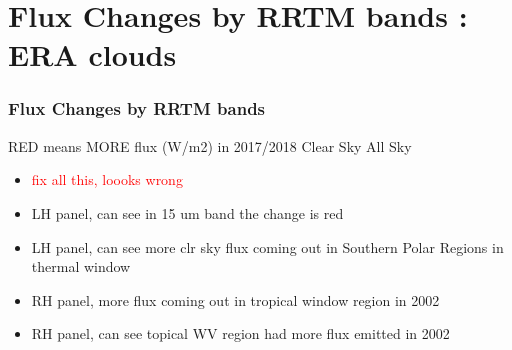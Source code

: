\documentclass[10pt,t]{beamer}
\begin{document}
\section{Flux Changes by RRTM bands : ERA clouds}
\begin{frame}
  \frametitle{Flux Changes by RRTM bands}
  RED means MORE flux (W/m2) in 2017/2018 \newline
  \hspace{0.50in} Clear Sky  \hspace{1.75in} All Sky \\
  \begin{center}
  \end{center}

  \begin{small}
    \begin{itemize}
    \item \textcolor{red}{fix all this, loooks wrong}
    \item LH panel, can see in 15 um band the change is red
    \item LH panel, can see more clr sky flux coming out in Southern Polar Regions in thermal window
    \item RH panel, more flux coming out in tropical window region in 2002
    \item RH panel, can see topical WV region had more flux emitted in 2002
    \end{itemize}
  \end{small}
\end{frame}
\end{document}
